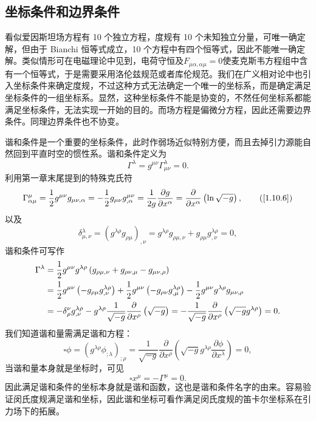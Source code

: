 \documentclass[11pt, a4paper, oneside, onecolumn]{ctexart}
\numberwithin{equation}{subsection}
\begin{document}
\subsection{坐标条件和边界条件}
看似爱因斯坦场方程有 10 个独立方程，度规有 10 个未知独立分量，可唯一确定解，但由于 Bianchi 恒等式成立，10 个方程中有四个恒等式，因此不能唯一确定解。类似情形可在电磁理论中见到，电荷守恒及$F_{\mu\alpha,\alpha\mu}=0$使麦克斯韦方程组中含有一个恒等式，于是需要采用洛伦兹规范或者库伦规范。我们在广义相对论中也引入坐标条件来确定度规，不过这种方式无法确定一个唯一的坐标系，而是确定满足坐标条件的一组坐标系。显然，这种坐标条件不能是协变的，不然任何坐标系都能满足坐标条件，无法实现一开始的目的。而场方程是偏微分方程，因此还需要边界条件。同理边界条件也不协变。

谐和条件是一个重要的坐标条件，此时作弱场近似特别方便，而且去掉引力源能自然回到平直时空的惯性系。谐和条件定义为
\begin{equation}
\Gamma^{\lambda}=g^{\mu\nu}\Gamma_{\mu\nu}^{\lambda}=0.
\end{equation}
利用第一章末尾提到的特殊克氏符
\begin{equation}
\Gamma_{\alpha\mu}^{\mu}=\frac12g^{\mu\nu}g_{\mu\nu,\alpha}=-\frac{1}{2}g_{\mu\nu}g^{\mu\nu}_{,\alpha}=\frac{1}{2g}\frac{\partial{}g}{\partial{}x^{\alpha}}=\frac{\partial{}}{\partial{}x^{\alpha}}\left(\ln\sqrt{-g}\right),\tag{\ref{1.10.6}}
\end{equation}
以及
\begin{equation}
\delta{}^{\lambda}_{\mu,\nu}=\left(g^{\lambda\rho}g_{\rho\mu}\right)_{,\nu}=g^{\lambda\rho}g_{\rho\mu,\nu}+g_{\rho\mu}g^{\lambda\rho}_{,\nu}=0,
\end{equation}
谐和条件可写作
\begin{align}
\Gamma^{\lambda}&=\frac{1}{2}g^{\mu\nu}g^{\lambda\rho}\left(g_{\rho\mu,\nu}+g_{\rho\nu,\mu}-g_{\mu\nu,\rho}\right)\notag\\
&=\frac{1}{2}g^{\mu\nu}\left(-g_{\rho\mu}g^{\lambda\rho}_{,\nu}\right)+\frac{1}{2}g^{\mu\nu}\left(-g_{\rho\nu}g^{\lambda\rho}_{,\mu}\right)-\frac{1}{2}g^{\mu\nu}g^{\lambda\rho}g_{\mu\nu,\rho}\notag\\
&=-\delta{}^{\nu}_{\rho}g^{\lambda\rho}_{,\nu}-g^{\lambda\rho}\frac{1}{\sqrt{-g}}\frac{\partial{}}{\partial{}x^{\rho}}\left(\sqrt{-g}\right)=-\frac{1}{\sqrt{-g}}\frac{\partial{}}{\partial{}x^{\rho}}\left(\sqrt{-g}g^{\lambda\rho}\right)=0.
\end{align}
我们知道谐和量需满足谐和方程：
\begin{equation}
\square\phi=\left(g^{\lambda\rho}\phi_{;\lambda}\right)_{;\rho}=\frac{1}{\sqrt{-g}}\frac{\partial{}}{\partial{}x^{\rho}}\left(\sqrt{-g}g^{\lambda\rho}\frac{\partial{}\phi}{\partial{}x^{\lambda}}\right)=0,
\end{equation}
当谐和量本身就是坐标时，可见
\begin{equation}
\square x^{\mu}=-\Gamma^{\mu}=0.
\end{equation}
因此满足谐和条件的坐标本身就是谐和函数，这也是谐和条件名字的由来。容易验证闵氏度规满足谐和坐标，因此谐和坐标可看作满足闵氏度规的笛卡尔坐标系在引力场下的拓展。
\end{document}
